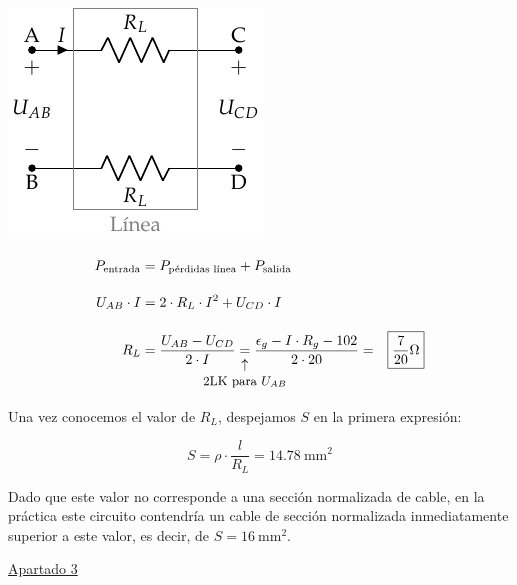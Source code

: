 \documentclass[10pt]{article}
\begin{document}
\begin{itemize}
    \vspace{2mm}
    \begin{minipage}{0.4\linewidth}
    \begin{center}
      \includegraphics[scale=1.2]{../figs/linea_lkv.pdf}
    \end{center}
    \end{minipage}
    \begin{minipage}{0.6\linewidth}
    \begin{align*}
        P_{\textrm{entrada}} &= P_{\textrm{pérdidas línea}} + P_{\textrm{salida}}\\[10pt]
        U_{AB} \cdot I &= 2 \cdot R_L \cdot I^2 + U_{CD} \cdot I\\[10pt] 
        R_L &= \frac{U_{AB}-U_{CD}}{2 \cdot I} \underarrow[=][\uparrow]{\small 2LK para \ensuremath{U_{AB}} } \frac{\epsilon_g - I\cdot R_g - 102}{2 \cdot 20} = \Aboxed{ {\frac{7}{20}}\si{\ohm} }
    \end{align*}
    \end{minipage}
\end{itemize}

Una vez conocemos el valor de $R_L$, despejamos $S$ en la primera expresión:

\[
  S = \rho \cdot \frac{l}{R_L} = \boxed{ \qty{14.78}{\milli\meter\squared} }
\]

Dado que este valor no corresponde a una sección normalizada de cable, en la práctica este circuito contendría un cable de sección normalizada inmediatamente superior a este valor, es decir, de $S = \qty{16}{\milli\meter\squared}$.

\vspace{6mm}

\underline{Apartado 3}
\end{document}
